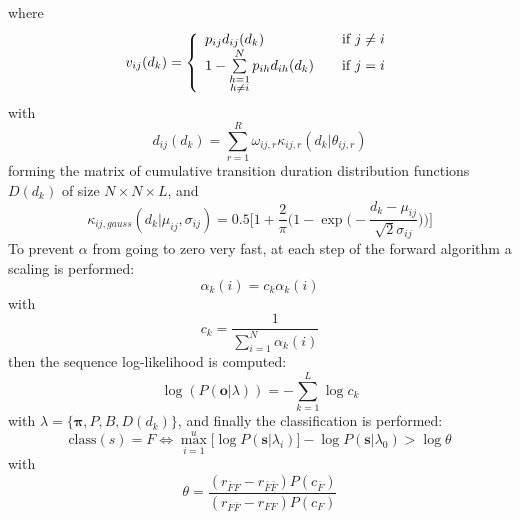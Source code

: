 \documentclass[12pt]{article} %
\begin{document}
where
\begin{equation}
    v_{ij}(d_k) = \left\{
        \begin{array}{l l}
            p_{ij} d_{ij}(d_k)
                & \quad \text{if $j \neq i$}\\
            1 - \sum\limits_{\substack{h=1 \\ h \neq i}}^{N} p_{ih} d_{ih}(d_k)
                & \quad \text{if $j = i$}
        \end{array} \right.
\end{equation}
with
\begin{equation}
    d_{ij}(d_k) = \sum_{r=1}^{R} \omega_{ij,r}\kappa_{ij,r}(d_k|\theta_{ij, r})
\end{equation}
forming the matrix of cumulative transition duration distribution functions
$ D(d_k) $ of size $ N \times N \times L $, and
\begin{equation}
    \kappa_{ij, gauss}(d_k | \mu_{ij}, \sigma_{ij}) = 
        0.5\bigg [1 + \frac{2}{\pi}\Big (
            1 - \exp \big (-\frac{d_k - \mu_{ij}}{\sqrt 2 \sigma_{ij}}\big )
        \Big ) \bigg ]
\end{equation}
To prevent $ \alpha $ from going to zero very fast, at each step of the forward
algorithm a scaling is performed:
\begin{equation}
    \alpha_k(i) = c_k \alpha_k(i)
\end{equation}
with
\begin{equation}
    c_k = \frac{1}{\sum\limits_{i=1}^{N} \alpha_k(i)}
\end{equation}
then the sequence log-likelihood is computed:
\begin{equation}
    \log(P(\boldsymbol{o}|\lambda)) = -\sum\limits_{k=1}^{L} \log c_k
\end{equation}
with $ \lambda = \{\boldsymbol{\pi}, P, B, D(d_k) \} $,  and finally the
classification is performed:
\begin{equation}
    \text{class}(s) = F \iff \max_{i=1}^{u} \big [
        \log P(\boldsymbol{s}|\lambda_i)
    \big ] - \log P(\boldsymbol{s}|\lambda_0) > \log \theta
\end{equation}
with
\begin{equation}
    \theta = \frac{(r_{\bar{F}F} - r_{\bar{F}\bar{F}})P(c_{\bar{F}})}
        {(r_{F \bar{F}} - r_{FF})P(c_{F})}
\end{equation}
\end{document}
